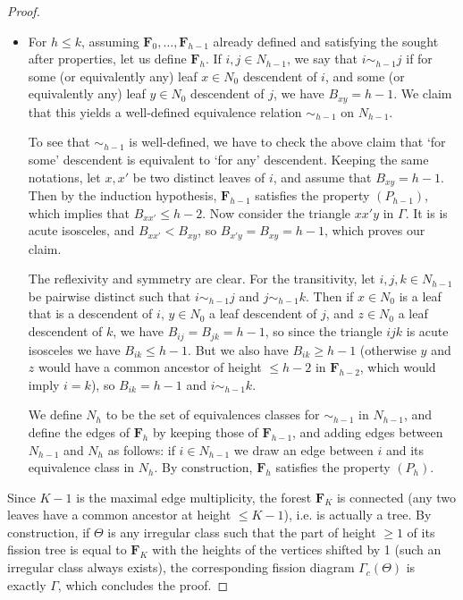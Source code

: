 \documentclass[11pt,a4paper]{amsart}
\numberwithin{equation}{section}
\begin{document}
\begin{proof}
\begin{itemize}
\item For $h\leq k$, assuming $\mathbf F_0, \dots, \mathbf F_{h-1}$ already defined and satisfying the sought after properties, let us define $\mathbf F_h$. If $i, j\in N_{h-1}$, we say that $i\sim_{h-1} j$ if for some (or equivalently any) leaf $x\in N_0$ descendent of $i$, and some (or equivalently any) leaf $y\in N_0$ descendent of $j$, we have $B_{xy}=h-1$. We claim that this yields a well-defined equivalence relation $\sim_{h-1}$ on $N_{h-1}$. 

To see that $\sim_{h-1}$ is well-defined, we have to check the above claim that `for some' descendent is equivalent to `for any' descendent. Keeping the same notations, let $x,x'$ be two distinct leaves of $i$, and assume that $B_{xy}=h-1$. Then by the induction hypothesis, $\mathbf F_{h-1}$ satisfies the property $(P_{h-1})$, which implies that $B_{xx'}\leq h-2$. Now consider the triangle $xx'y$ in $\Gamma$. It is is acute isosceles, and $B_{xx'}<B_{xy}$, so $B_{x'y}=B_{xy}=h-1$, which proves our claim. 

The reflexivity and symmetry are clear. For the transitivity, let $i, j, k\in N_{h-1}$  be pairwise distinct such that $i\sim_{h-1} j$ and $j\sim_{h-1} k$. Then if $x\in N_0$ is a leaf that is a descendent of $i$, $y\in N_0$ a leaf descendent of $j$, and $z\in N_0$ a leaf descendent of $k$, we have $B_{ij}=B_{jk}=h-1$, so since the triangle $ijk$ is acute isosceles we have $B_{ik}\leq h-1$. But we also have $B_{ik}\geq h-1$ (otherwise $y$ and $z$ would have a common ancestor of height $\leq h-2$ in $\mathbf F_{h-2}$, which would imply $i=k$), so $B_{ik}=h-1$ and $i\sim_{h-1}k$. 

We define $N_h$ to be the set of equivalences classes for $\sim_{h-1}$ in $N_{h-1}$, and define the edges of $\mathbf F_h$ by keeping those of $\mathbf F_{h-1}$, and adding edges between $N_{h-1}$ and $N_h$ as follows: if $i\in N_{h-1}$ we draw an edge between $i$ and its equivalence class in $N_h$. By construction, $\mathbf F_h$ satisfies the property $(P_h)$. 
\end{itemize}

Since $K-1$ is the maximal edge multiplicity, the forest $\mathbf F_K$ is connected (any two leaves have a common ancestor at height $\leq K-1$), i.e. is actually a tree. By construction, if $\Theta$ is any irregular class such that the part of height $\geq 1$ of its fission tree is equal to $\mathbf F_K$ with the heights of the vertices shifted by 1 (such an irregular class always exists), the corresponding fission diagram $\Gamma_c(\Theta)$ is exactly $\Gamma$, which concludes the proof.
\end{proof}
\end{document}
